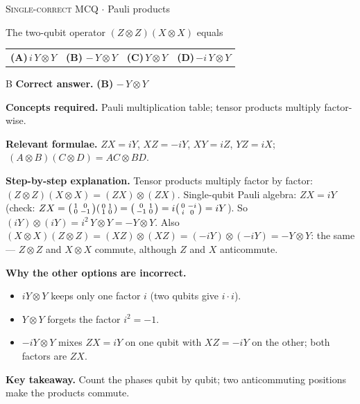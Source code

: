 \documentclass[11pt,a4paper]{article}
\newcommand{\optlabel}[1]{\textbf{(#1)}}
\newcommand{\correctlabel}[1]{\textcolor{okgreen}{\textbf{(#1)}\,\ding{51}}}
\newenvironment{qitem}[1]{\begin{list}{}{\setlength{\leftmargin}{3.3em}\setlength{\labelwidth}{3.1em}%
  \setlength{\labelsep}{0.2em}\setlength{\topsep}{3pt}\setlength{\parsep}{3pt}}\item[\textbf{Q.#1}\hfill]}{\end{list}}
\newcommand{\qsep}{\par\vspace{2pt}{\color{black!15}\hrule}\vspace{4pt}}
\newcommand{\qmeta}[2]{{\footnotesize\color{black!60}\textsc{#1} \;$\cdot$\; #2}\par}
\begin{document}
\begin{qitem}{22}
\qmeta{Single-correct MCQ}{Pauli products}
The two-qubit operator $(Z\otimes Z)(X\otimes X)$ equals
\par\smallskip\noindent\begin{tabularx}{\linewidth}{@{}*{4}{L}@{}}
\optlabel{A}\,$i\,Y\otimes Y$ & \correctlabel{B}\,$-\,Y\otimes Y$ & \optlabel{C}\,$Y\otimes Y$ & \optlabel{D}\,$-i\,Y\otimes Y$
\end{tabularx}
\end{qitem}
\begin{solbox}{B}
\textbf{\color{brand}Correct answer.} \textcolor{okgreen}{\textbf{(B)}} $-\,Y\otimes Y$

\textbf{\color{brand}Concepts required.} Pauli multiplication table; tensor products multiply factor-wise.

\textbf{\color{brand}Relevant formulae.} $ZX = iY$, $XZ = -iY$, $XY = iZ$, $YZ = iX$; $\ (A\otimes B)(C\otimes D) = AC\otimes BD$.

\textbf{\color{brand}Step-by-step explanation.} Tensor products multiply factor by factor: $(Z\otimes Z)(X\otimes X) = (ZX)\otimes(ZX)$.
Single-qubit Pauli algebra: $ZX = iY$ (check: $ZX = \begin{psmallmatrix}1&0\\0&-1\end{psmallmatrix}\begin{psmallmatrix}0&1\\1&0\end{psmallmatrix}
= \begin{psmallmatrix}0&1\\-1&0\end{psmallmatrix} = i\begin{psmallmatrix}0&-i\\i&0\end{psmallmatrix} = iY$).
So $(iY)\otimes(iY) = i^2\,Y\otimes Y = -Y\otimes Y$. Also $(X\otimes X)(Z\otimes Z) = (XZ)\otimes(XZ) = (-iY)\otimes(-iY) = -Y\otimes Y$:
the same --- $Z\otimes Z$ and $X\otimes X$ commute, although $Z$ and $X$ anticommute.

\textbf{\color{brand}Why the other options are incorrect.}
\begin{itemize}[leftmargin=2.4em, itemsep=1pt, topsep=2pt]
\item[\textbf{(A)}] $iY\otimes Y$ keeps only one factor $i$ (two qubits give $i\cdot i$).
\item[\textbf{(C)}] $Y\otimes Y$ forgets the factor $i^2 = -1$.
\item[\textbf{(D)}] $-iY\otimes Y$ mixes $ZX = iY$ on one qubit with $XZ = -iY$ on the other; both factors are $ZX$.
\end{itemize}
\textbf{\color{brand}Key takeaway.} Count the phases qubit by qubit; two anticommuting positions make the products commute.
\end{solbox}
\qsep
\end{document}
